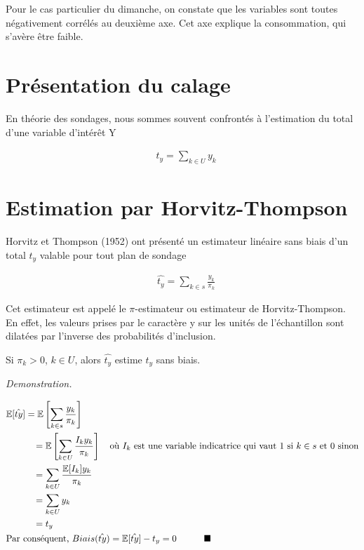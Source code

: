 Pour le cas particulier du dimanche, on constate que les variables sont toutes négativement corrélés au deuxième axe. Cet axe explique la consommation, qui s'avère être faible.

\section{Présentation du calage}

En théorie des sondages, nous sommes souvent confrontés à l'estimation du total d'une variable d'intérêt Y

\begin{align*}
& t_{y}=\sum_{k\in U} y_k
\end{align*}

\section{Estimation par Horvitz-Thompson}

Horvitz et Thompson (1952) ont présenté un estimateur linéaire sans biais d'un total $t_y$ valable pour tout plan de sondage

\begin{align*}
& \hat{t_{y}}=\sum_{k\in s} \frac{y_k}{\pi_k}
\end{align*}

Cet estimateur est appelé le $\pi$-estimateur ou estimateur de Horvitz-Thompson. En effet, les valeurs prises par le caractère y sur les unités de l'échantillon sont dilatées par l'inverse des probabilités d'inclusion.

\begin{theorem}
Si $\pi_k > 0$, $k\in U$, alors $\hat{t_y}$ estime $t_y$ sans biais.
\end{theorem}

\textit{Demonstration.}

\begin{align*}
& \mathbb{E}[\hat{ty}] = \mathbb{E}\left[ \sum_{k\in s} \frac{y_k}{\pi_k} \right] \\
& \quad\quad\quad = \mathbb{E}\left[ \sum_{k\in U} \frac{I_k y_k}{\pi_k} \right] \quad \textnormal{où } I_k \textnormal{ est une variable indicatrice qui vaut 1 si } k\in s \textnormal{ et } 0 \textnormal{ sinon} \\
& \quad\quad\quad = \sum_{k\in U} \frac{\mathbb{E}[I_k] y_k}{\pi_k} \\
& \quad\quad\quad = \sum_{k\in U} y_k \\
& \quad\quad\quad = t_y \\
& \textnormal{Par conséquent, } Biais(\hat{ty})=\mathbb{E}[\hat{ty}]-t_y=0 \quad\quad\quad \blacksquare
\end{align*}

